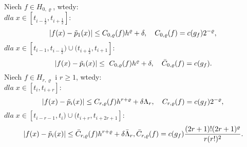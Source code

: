 \documentclass[oik, pdftex, robocza, man]{mgrwms}
\begin{document}
    \begin{lemma} \label{lem:algMP_2}
        Niech $f \in H_{0, \varrho}$, wtedy: \\
        $dla \; x \in [t_{i-\frac{1}{2}}, t_{i + \frac{1}{2}}] :$
        \begin{equation*}
            |f(x) - \tilde{p}_{1}(x)| \leq C_{0, \varrho}(f) h^{\varrho} + \delta, \quad C_{0, \varrho}(f) = c(g_{f}) 2^{-\varrho}, \\
        \end{equation*}
        $dla \; x \in [t_{i-1}, t_{i - \frac{1}{2}}) \cup (t_{i + \frac{1}{2}}, t_{i+1}]  :$
        \begin{equation*}
            |f(x) - \tilde{p}_{i}(x)| \leq \ {C} _{0, \varrho}(f) h^{\varrho}  + \delta, \quad \bar{C} _{0, \varrho}(f) = c(g_{f}). \\
        \end{equation*}
        Niech $f \in H_{r, \varrho}$ i $r \geq 1$, wtedy: \\
        $dla \; x \in [t_{i}, t_{i + r}] : $
        \begin{equation*}
            |f(x) - \tilde{p}_{i}(x)| \leq C_{r, \varrho}(f) h^{r+\varrho} + \delta\Lambda_{r}, \quad C_{r, \varrho}(f) = c(g_{f}) 2^{-\varrho}, \\
        \end{equation*}
        $dla \; x \in [t_{i-r-1}, t_{i}) \cup (t_{i + r}, t_{i+2r+1}]  :$
        \begin{equation*}
            |f(x) - \tilde{p}_{i}(x)| \leq \bar{C} _{r, \varrho}(f) h^{r+\varrho} + \delta\bar{\Lambda}_{r}, \bar{C} _{r, \varrho}(f) = c(g_{f}) \frac{(2r+1)!(2r+1)^{\varrho}}{r(r!)^{2}}. \\
        \end{equation*}
    \end{lemma}
\end{document}
